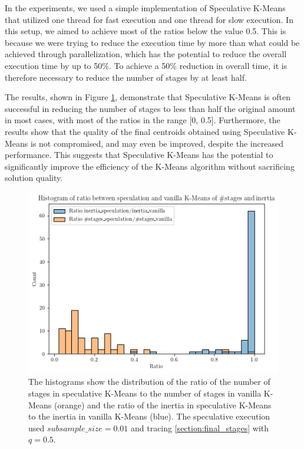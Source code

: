 In the experiments, we used a simple implementation of Speculative K-Means that utilized one thread for fast execution and one thread for slow execution. In this setup, we aimed to achieve most of the ratios below the value 0.5. This is because we were trying to reduce the execution time by more than what could be achieved through parallelization, which has the potential to reduce the overall execution time by up to 50\%. To achieve a 50\% reduction in overall time, it is therefore necessary to reduce the number of stages by at least half.

The results, shown in Figure \ref{fig:histogram_ratio_steps_inertia}, demonstrate that Speculative K-Means is often successful in reducing the number of stages to less than half the original amount in most cases, with most of the ratios in the range [0, 0.5]. Furthermore, the results show that the quality of the final centroids obtained using Speculative K-Means is not compromised, and may even be improved, despite the increased performance. This suggests that Speculative K-Means has the potential to significantly improve the efficiency of the K-Means algorithm without sacrificing solution quality.

\begin{figure}[h]
\centering
\includegraphics[width=\linewidth]{./plots/histogram_ratio_steps_inertia.png}
\caption{The histograms show the distribution of the ratio of the number of stages in speculative K-Means to the number of stages in vanilla K-Means (orange) and the ratio of the inertia in speculative K-Means to the inertia in vanilla K-Means (blue). The speculative execution used $subsample\_size=0.01$ and tracing \ref{section:final_stages} with $q=0.5$.}
\label{fig:histogram_ratio_steps_inertia}
\end{figure}

